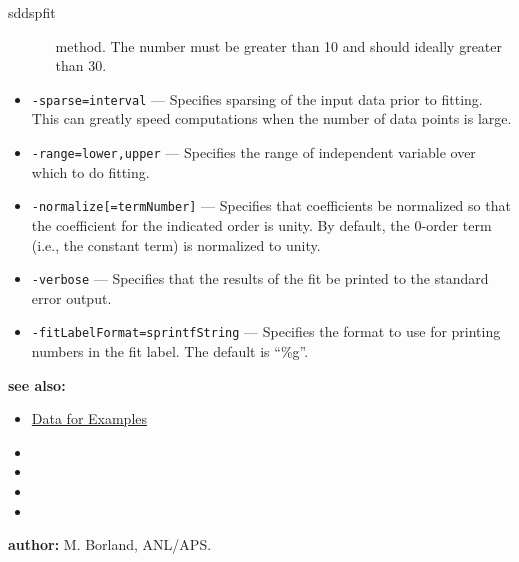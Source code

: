 \begin{sddsprog}{sddspfit}
\begin{itemize}
\begin{itemize}
            method. The number must be greater than 10 and should ideally greater than 30.
        \end{itemize}
      \item \verb|-sparse=interval| --- Specifies sparsing of the input data prior to fitting. This can greatly speed computations when the number of data points is large.
      \item \verb|-range=lower,upper| --- Specifies the range of independent variable over which to do fitting.
      \item \verb|-normalize[=termNumber]| --- Specifies that coefficients be normalized so that the coefficient for the indicated order is unity. By default, the 0-order term (i.e., the constant term) is normalized to unity.
      \item \verb|-verbose| --- Specifies that the results of the fit be printed to the standard error output.
      \item \verb|-fitLabelFormat=sprintfString| --- Specifies the format to use for printing numbers in the fit label. The default is ``\%g''.
    \end{itemize}
  \item \textbf{see also:}
    \begin{itemize}
      \item \hyperref[exampleData]{Data for Examples}
      \item {}
      \item {}
      \item {}
      \item {}
    \end{itemize}
  \item \textbf{author:} M. Borland, ANL/APS.
\end{sddsprog}
